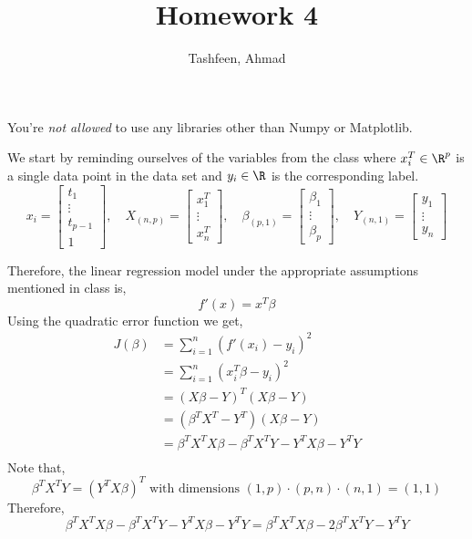 \documentclass{homework}
\author{Tashfeen, Ahmad}
\title{Homework 4}
\begin{document}
 \maketitle
You're \textit{not allowed} to use any libraries other than Numpy or Matplotlib.

We start by reminding ourselves of the variables from the class where $x_i^T \in \R^p$ is a single data point in the data set and $y_i\in \R$ is the corresponding label.
\[
  x_i =
  \begin{bmatrix}
    t_1 \\ \vdots \\ t_{p-1} \\ 1
  \end{bmatrix},
  \quad
  X_{(n, p)} =
  \begin{bmatrix}
    x^T_1 \\ \vdots \\ x^T_n
  \end{bmatrix},
  \quad
  \beta_{(p, 1)} =
  \begin{bmatrix}
    \beta_1 \\ \vdots \\ \beta_p
  \end{bmatrix},
  \quad
  Y_{(n, 1)} =
  \begin{bmatrix}
    y_1 \\ \vdots \\ y_n
  \end{bmatrix}
\]

Therefore, the linear regression model under the appropriate assumptions mentioned in class is,
\[
  f'(x) = x^T\beta
\]
Using the quadratic error function we get,
\begin{align*}
  J(\beta) & = \sum_{i=1}^n(f'(x_i) - y_{i})^2 \\
           & = \sum_{i=1}^n(x_i^T\beta - y_{i})^2 \\
           & = (X\beta - Y)^T(X\beta - Y) \\
           & = (\beta^TX^T - Y^T)(X\beta - Y) \\
           & = \beta^TX^TX\beta - \beta^TX^TY - Y^TX\beta - Y^TY \\
\end{align*}
Note that,
\[
     \beta^TX^TY = (Y^TX\beta)^T \text{ with dimensions } (1, p) \cdot (p, n) \cdot (n, 1) = (1, 1)
\]
Therefore,
\[
    \beta^TX^TX\beta - \beta^TX^TY - Y^TX\beta - Y^TY = \beta^TX^TX\beta - 2\beta^TX^TY - Y^TY
\]
\end{document}
